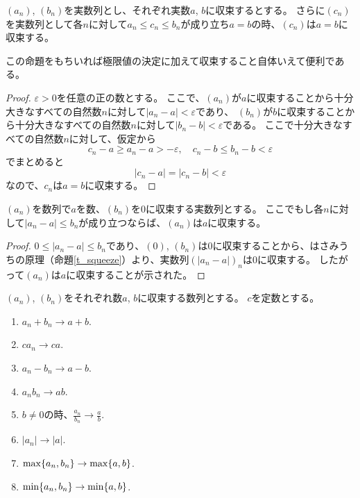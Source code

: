 \begin{proposition}[はさみうちの原理]
\label{t_squeeze}
$(a_n)$, $(b_n)$を実数列とし、それぞれ実数$a$, $b$に収束するとする。
さらに$(c_n)$を実数列として各$n$に対して$a_n \le c_n \le b_n$が成り立ち$a = b$の時、$(c_n)$は$a = b$に収束する。
\end{proposition}

この命題をもちいれば極限値の決定に加えて収束すること自体いえて便利である。

\begin{proof}
$\varepsilon > 0$を任意の正の数とする。
ここで、$(a_n)$が$a$に収束することから十分大きなすべての自然数$n$に対して$|a_n-a| < \varepsilon$であり、
$(b_n)$が$b$に収束することから十分大きなすべての自然数$n$に対して$|b_n-b| < \varepsilon$である。
ここで十分大きなすべての自然数$n$に対して、仮定から
$$
c_n-a \ge a_n-a > -\varepsilon, \quad c_n-b \le b_n-b < \varepsilon
$$
でまとめると
$$
|c_n-a| = |c_n-b| < \varepsilon
$$
なので、$c_n$は$a = b$に収束する。
\end{proof}

\begin{corollary}
\label{t_squeeze2}
$(a_n)$を数列で$a$を数、$(b_n)$を$0$に収束する実数列とする。
ここでもし各$n$に対して$|a_n-a| \le b_n$が成り立つならば、$(a_n)$は$a$に収束する。
\end{corollary}

\begin{proof}
$0 \le |a_n-a| \le b_n$であり、$(0)$, $(b_n)$は$0$に収束することから、はさみうちの原理（命題\ref{t_squeeze}）より、実数列$(|a_n-a|)_n$は$0$に収束する。
したがって$(a_n)$は$a$に収束することが示された。
\end{proof}

\begin{proposition}[極限と四則演算]
$(a_n)$, $(b_n)$をそれぞれ数$a$, $b$に収束する数列とする。
$c$を定数とする。
\begin{enumerate}
\item
$a_n+b_n \to a+b$.
\item
$c a_n \to c a$.
\item
$a_n-b_n \to a-b$.
\item
$a_n b_n \to a b$.
\item
$b \ne 0$の時、$\frac{a_n}{b_n} \to \frac{a}{b}$.
\item
$|a_n| \to |a|$.
\item
$\max\{ a_n, b_n \} \to \max\{ a, b \}$.
\item
$\min\{ a_n, b_n \} \to \min\{ a, b \}$.
\end{enumerate}
\end{proposition}

